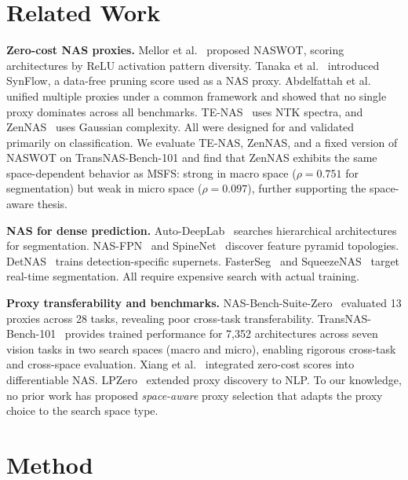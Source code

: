 \documentclass[10pt,twocolumn,letterpaper]{article}
\begin{document}
\section{Related Work}

\textbf{Zero-cost NAS proxies.}
Mellor et al.~\cite{mellor2021naswot} proposed NASWOT, scoring architectures by ReLU activation pattern diversity.
Tanaka et al.~\cite{tanaka2020synflow} introduced SynFlow, a data-free pruning score used as a NAS proxy.
Abdelfattah et al.~\cite{abdelfattah2021zerocost} unified multiple proxies under a common framework and showed that no single proxy dominates across all benchmarks.
TE-NAS~\cite{chen2021tenas} uses NTK spectra, and ZenNAS~\cite{lin2021zennas} uses Gaussian complexity.
All were designed for and validated primarily on classification.
We evaluate TE-NAS, ZenNAS, and a fixed version of NASWOT on TransNAS-Bench-101 and find that ZenNAS exhibits the same space-dependent behavior as MSFS: strong in macro space ($\rho{=}0.751$ for segmentation) but weak in micro space ($\rho{=}0.097$), further supporting the space-aware thesis.

\textbf{NAS for dense prediction.}
Auto-DeepLab~\cite{liu2019autodeeplab} searches hierarchical architectures for segmentation.
NAS-FPN~\cite{ghiasi2019nasfpn} and SpineNet~\cite{du2020spinenet} discover feature pyramid topologies.
DetNAS~\cite{chen2019detnas} trains detection-specific supernets.
FasterSeg~\cite{chen2020fasterseg} and SqueezeNAS~\cite{shaw2019squeezenas} target real-time segmentation.
All require expensive search with actual training.

\textbf{Proxy transferability and benchmarks.}
NAS-Bench-Suite-Zero~\cite{krishnakumar2022suitezero} evaluated 13 proxies across 28 tasks, revealing poor cross-task transferability.
TransNAS-Bench-101~\cite{duan2021transnasbench101} provides trained performance for 7{,}352 architectures across seven vision tasks in two search spaces (macro and micro), enabling rigorous cross-task and cross-space evaluation.
Xiang et al.~\cite{xiang2021zerocostpt} integrated zero-cost scores into differentiable NAS.
LPZero~\cite{li2024lpzero} extended proxy discovery to NLP.
To our knowledge, no prior work has proposed \emph{space-aware} proxy selection that adapts the proxy choice to the search space type.

\section{Method}
\end{document}
